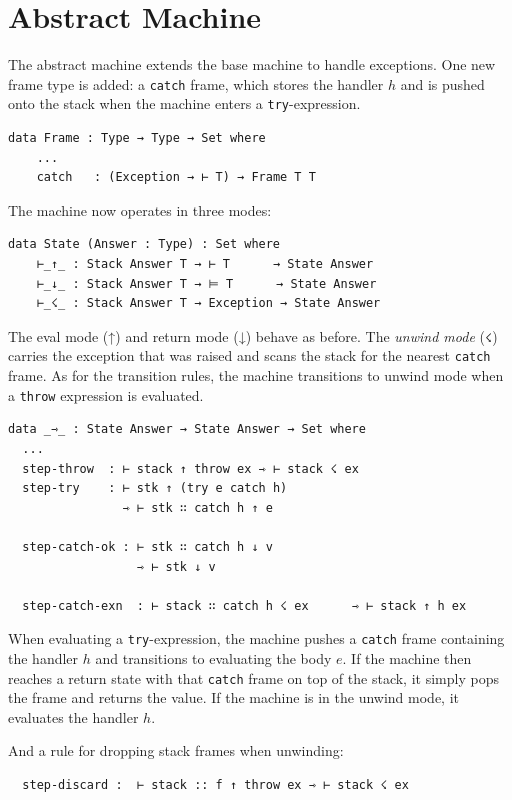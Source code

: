 \section{Abstract Machine}

The abstract machine extends the base machine to handle exceptions.
One new frame type is added: a \texttt{catch} frame, which stores the handler $h$ and is pushed onto the stack when the machine enters a \texttt{try}-expression.

\begin{verbatim}
data Frame : Type → Type → Set where
    ...
    catch   : (Exception → ⊢ T) → Frame T T
\end{verbatim}

The machine now operates in three modes:
\begin{verbatim}
data State (Answer : Type) : Set where
    ⊢_↑_ : Stack Answer T → ⊢ T      → State Answer
    ⊢_↓_ : Stack Answer T → ⊨ T      → State Answer
    ⊢_☇_ : Stack Answer T → Exception → State Answer
\end{verbatim}
The eval mode (↑) and return mode (↓) behave as before.
The \textit{unwind mode} (\verb|☇|) carries the exception that was raised and scans the stack for the nearest \texttt{catch} frame.
As for the transition rules, the machine transitions to unwind mode when a \texttt{throw} expression is evaluated.
\begin{verbatim}
data _⇾_ : State Answer → State Answer → Set where
  ...
  step-throw  : ⊢ stack ↑ throw ex ⇾ ⊢ stack ☇ ex
  step-try    : ⊢ stk ↑ (try e catch h)
                ⇾ ⊢ stk ∷ catch h ↑ e

  step-catch-ok : ⊢ stk ∷ catch h ↓ v
                  ⇾ ⊢ stk ↓ v
  
  step-catch-exn  : ⊢ stack ∷ catch h ☇ ex      ⇾ ⊢ stack ↑ h ex
\end{verbatim}

When evaluating a \texttt{try}-expression, the machine pushes a \texttt{catch} frame containing the handler $h$ and transitions to evaluating the body $e$.
If the machine then reaches a return state with that \texttt{catch} frame on top of the stack, it simply pops the frame and returns the value. If the machine is in the unwind mode, it evaluates the handler $h$.


And a rule for dropping stack frames when unwinding:
\begin{verbatim}
  step-discard :  ⊢ stack :: f ↑ throw ex ⇾ ⊢ stack ☇ ex
\end{verbatim}

